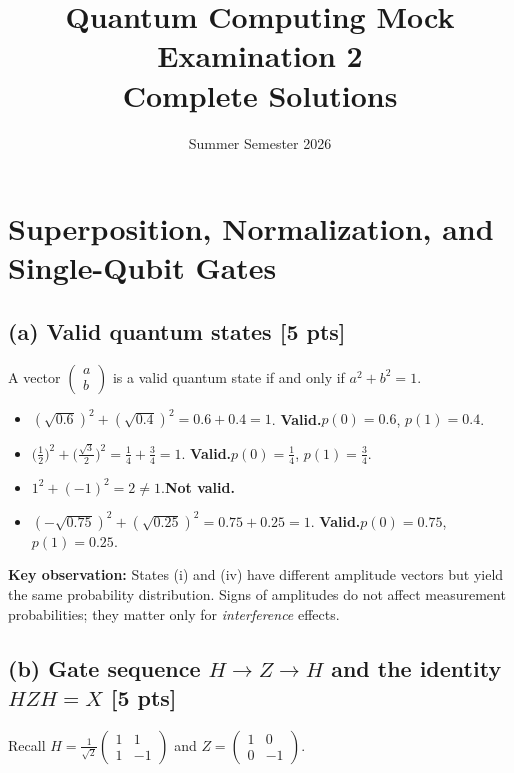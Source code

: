 \documentclass[11pt,a4paper]{article}
\title{Quantum Computing Mock Examination 2\\[0.3em]Complete Solutions}
\author{Summer Semester 2026}
\date{}
\begin{document}
\maketitle
\tableofcontents
\newpage

\section{Superposition, Normalization, and Single-Qubit Gates}

\subsection*{(a) Valid quantum states [5 pts]}

A vector $\begin{pmatrix}a\\b\end{pmatrix}$ is a valid quantum state if and only if $a^2+b^2=1$.

\begin{itemize}
  \item[(i)] $(\sqrt{0.6})^2+(\sqrt{0.4})^2=0.6+0.4=1$.\quad
    \textbf{Valid.}\quad $p(0)=0.6$,\; $p(1)=0.4$.
  \item[(ii)] $\bigl(\tfrac{1}{2}\bigr)^2+\bigl(\tfrac{\sqrt{3}}{2}\bigr)^2=\tfrac{1}{4}+\tfrac{3}{4}=1$.\quad
    \textbf{Valid.}\quad $p(0)=\tfrac{1}{4}$,\; $p(1)=\tfrac{3}{4}$.
  \item[(iii)] $1^2+(-1)^2=2\ne1$.\quad \textbf{Not valid.}
  \item[(iv)] $(-\sqrt{0.75})^2+(\sqrt{0.25})^2=0.75+0.25=1$.\quad
    \textbf{Valid.}\quad $p(0)=0.75$,\; $p(1)=0.25$.
\end{itemize}

\noindent\textbf{Key observation:} States (i) and (iv) have different amplitude vectors but yield
the same probability distribution. Signs of amplitudes do not affect measurement probabilities;
they matter only for \emph{interference} effects.

\subsection*{(b) Gate sequence $H\to Z\to H$ and the identity $HZH=X$ [5 pts]}

Recall $H=\frac{1}{\sqrt{2}}\begin{pmatrix}1&1\\1&-1\end{pmatrix}$
and $Z=\begin{pmatrix}1&0\\0&-1\end{pmatrix}$.
\end{document}
